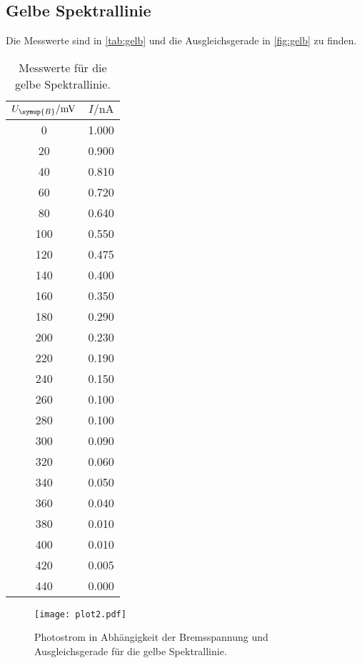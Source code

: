 \subsection{Gelbe Spektrallinie}
\label{sec:gelbe_Spektrallinie}
Die Messwerte sind in \autoref{tab:gelb} und die Ausgleichsgerade in \autoref{fig:gelb} zu finden.
\begin{table}
    \centering
    \caption{Messwerte für die gelbe Spektrallinie.}
    \label{tab:rot}
    \begin{tabular}{c c}
        \toprule
        $U_{\symup{B}} / \unit{\milli\volt}$ & $I / \unit{\nano\ampere}$ \\
        \midrule
         0 & 1.000 \\
        20 & 0.900 \\
        40 & 0.810 \\
        60 & 0.720 \\
        80 & 0.640 \\
       100 & 0.550 \\
       120 & 0.475 \\
       140 & 0.400 \\
       160 & 0.350 \\
       180 & 0.290 \\
       200 & 0.230 \\
       220 & 0.190 \\
       240 & 0.150 \\
       260 & 0.100 \\
       280 & 0.100 \\
       300 & 0.090 \\
       320 & 0.060 \\
       340 & 0.050 \\
       360 & 0.040 \\
       380 & 0.010 \\
       400 & 0.010 \\
       420 & 0.005 \\
       440 & 0.000 \\
        \bottomrule
    \end{tabular}
\end{table}

\begin{figure}
    \centering
    \label{fig:gelb}
    \caption{Photostrom in Abhängigkeit der Bremsspannung und Ausgleichsgerade für die gelbe Spektrallinie.}
    \texttt{[image: plot2.pdf]}
\end{figure}
